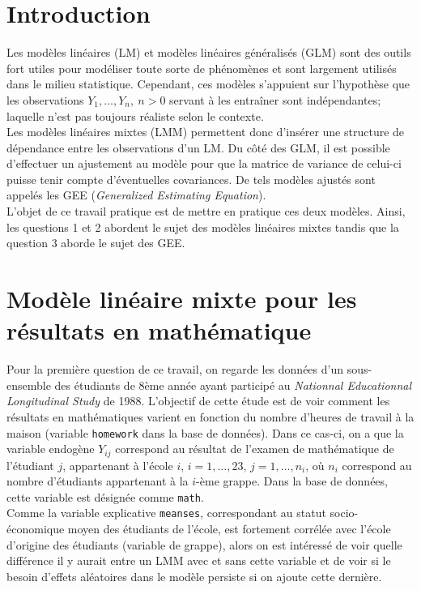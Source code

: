 \documentclass{article}
\begin{document}
\section*{Introduction}
Les modèles linéaires (LM) et modèles linéaires généralisés (GLM) sont des outils fort utiles pour modéliser toute sorte de phénomènes et sont largement utilisés dans le milieu statistique. Cependant, ces modèles s'appuient sur l'hypothèse que les observations $Y_1,\dots,Y_n,\ n>0$ servant à les entraîner sont indépendantes; laquelle n'est pas toujours réaliste selon le contexte.\\

Les modèles linéaires mixtes (LMM) permettent donc d'insérer une structure de dépendance entre les observations d'un LM. Du côté des GLM, il est possible d'effectuer un ajustement au modèle pour que la matrice de variance de celui-ci puisse tenir compte d'éventuelles covariances. De tels modèles ajustés sont appelés les GEE (\textit{Generalized Estimating Equation}).\\

L'objet de ce travail pratique est de mettre en pratique ces deux modèles. Ainsi, les questions 1 et 2 abordent le sujet des modèles linéaires mixtes tandis que la question 3 aborde le sujet des GEE.


\section{Modèle linéaire mixte pour les résultats en mathématique}\label{sect_qst1}
	Pour la première question de ce travail, on regarde les données d'un sous-ensemble des étudiants de 8ème année ayant participé au \textit{Nationnal Educationnal Longitudinal Study} de 1988. L'objectif de cette étude est de voir comment les résultats en mathématiques varient en fonction du nombre d'heures de travail à la maison (variable \texttt{homework} dans la base de données).
	Dans ce cas-ci, on a que la variable endogène $Y_{ij}$ correspond au résultat de l'examen de mathématique de l'étudiant $j$, appartenant à l'école $i$, $i=1,\dots, 23$, $j=1,\dots,n_i$, où $n_i$ correspond au nombre d'étudiants appartenant à la $i$-ème grappe. Dans la base de données, cette variable est désignée comme \texttt{math}.\\
	
	Comme la variable explicative \texttt{meanses}, correspondant au statut socio-économique moyen des étudiants de l’école, est fortement corrélée avec l'école d'origine des étudiants (variable de grappe), alors on est intéressé de voir quelle différence il y aurait entre un LMM avec et sans cette variable et de voir si le besoin d'effets aléatoires dans le modèle persiste si on ajoute cette dernière.
\end{document}
